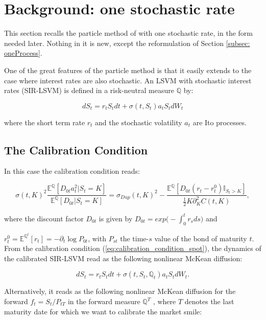 \section{Background: one stochastic rate}\label{sec: oneRate}
This section recalls the particle method of \cite{guyonLabordere} with one stochastic rate, in the form needed later. Nothing in it is new, except the reformulation of Section \ref{subsec: oneProcess}.

One of the great features of the particle method is that it easily extends to
the case where interest rates are also stochastic. An LSVM with stochastic
interest rates (SIR-LSVM) is defined in a risk-neutral measure  $ \mathbb{Q}  $ by:

\begin{equation}  \label{eq:spot} dS_t=r_tS_t dt + \sigma(t,S_t)a_t S_tdW_t 
\end{equation}

where the short term rate $r_t$ and the stochastic volatility $a_t$ are Ito processes.
\subsection{The Calibration Condition}
In this case the calibration condition reads:

\begin{equation} \label{eq:calibration_condition_spot} \sigma(t,K)^2 \frac{\mathbb{E}^{\mathbb{Q}}[ D_{0t}a_t^2 | S_t = K ]}{ \mathbb{E}^{\mathbb{Q}}[ D_{0t} | S_t = K ] } = \sigma_{Dup}(t,K) ^2 - \frac{ \mathbb{E}^{\mathbb{Q}}[ D_{0t}(r_t-r^0_t)\mathbb{I}_{S_t>K} ]}{ \frac{1}{2}K\partial^2_KC(t,K) },
\end{equation}

where the discount factor $ D_{0t}$ is given by $ D_{0t}=exp\bigg(-\int_0^t r_sds\bigg)$ and

$r_t^0 = \mathbb{E}^{\mathbb{Q}^t} [r_t] = -\partial_t\log P_{0t}$, with $ P_{st} $ the time-$s$ value of the bond of maturity $t$.\\

From the calibration condition (\ref{eq:calibration_condition_spot}), the dynamics of the calibrated SIR-LSVM read as the following nonlinear McKean diffusion: 

$$ dS_t=r_tS_t dt + \sigma(t,S_t,\mathbb{Q}_t)a_t S_tdW_t .$$

Alternatively, it reads as the following nonlinear McKean diffusion for the
forward $f_t = S_t/P_{tT}$ in the forward measure $\mathbb{Q}^T$ , where $T$ denotes the last maturity date for which we want to calibrate the market smile:


